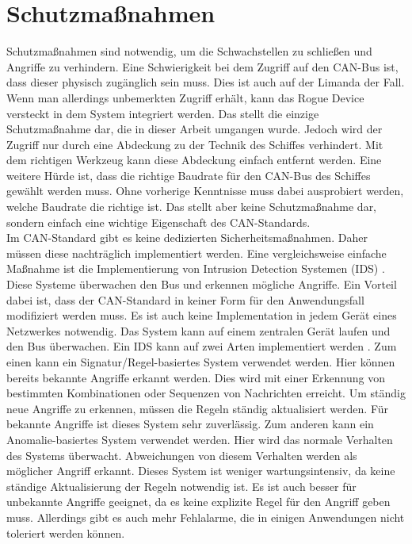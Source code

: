 \section{Schutzmaßnahmen} \label{sec:schutzmassnahmen}
Schutzmaßnahmen sind notwendig, um die Schwachstellen zu schließen und Angriffe zu verhindern.
Eine Schwierigkeit bei dem Zugriff auf den CAN-Bus ist, dass dieser physisch zugänglich sein muss. Dies ist auch auf der Limanda
der Fall. Wenn man allerdings unbemerkten Zugriff erhält, kann das Rogue Device versteckt in dem System integriert werden. 
Das stellt die einzige Schutzmaßnahme dar, die in dieser Arbeit umgangen wurde. Jedoch wird der Zugriff nur durch eine Abdeckung zu der Technik des Schiffes
verhindert. Mit dem richtigen Werkzeug kann diese Abdeckung einfach entfernt werden.
Eine weitere Hürde ist, dass die richtige Baudrate für den CAN-Bus des Schiffes gewählt werden muss. Ohne vorherige Kenntnisse
muss dabei ausprobiert werden, welche Baudrate die richtige ist. Das stellt aber keine Schutzmaßnahme dar, sondern einfach
eine wichtige Eigenschaft des CAN-Standards.\\
Im CAN-Standard gibt es keine dedizierten Sicherheitsmaßnahmen. Daher müssen diese nachträglich implementiert werden.
Eine vergleichsweise einfache Maßnahme ist die Implementierung von Intrusion Detection Systemen (IDS) \cite{Gmiden2016}. 
Diese Systeme überwachen
den Bus und erkennen mögliche Angriffe. Ein Vorteil dabei ist, dass der CAN-Standard in keiner Form für den 
Anwendungsfall modifiziert werden muss. Es ist auch keine Implementation in jedem Gerät eines Netzwerkes notwendig.
Das System kann auf einem zentralen Gerät laufen und den Bus überwachen.  
Ein IDS kann auf zwei Arten implementiert werden \cite{Hoppe2009}. Zum einen kann ein Signatur/Regel-basiertes System verwendet werden.
Hier können bereits bekannte Angriffe erkannt werden. Dies wird mit einer Erkennung von bestimmten Kombinationen oder Sequenzen
von Nachrichten erreicht. Um ständig neue Angriffe zu erkennen, müssen die Regeln ständig aktualisiert werden.
Für bekannte Angriffe ist dieses System sehr zuverlässig. Zum anderen kann ein Anomalie-basiertes System verwendet werden.
Hier wird das normale Verhalten des Systems überwacht. Abweichungen von diesem Verhalten werden als möglicher Angriff erkannt.
Dieses System ist weniger wartungsintensiv, da keine ständige Aktualisierung der Regeln notwendig ist. Es ist auch besser für
unbekannte Angriffe geeignet, da es keine explizite Regel für den Angriff geben muss. Allerdings gibt es auch mehr Fehlalarme,
die in einigen Anwendungen nicht toleriert werden können. \\
